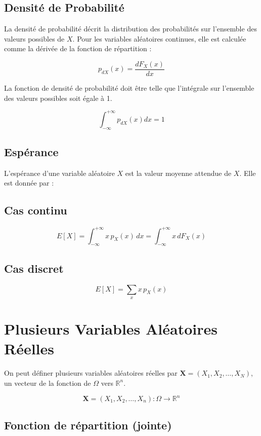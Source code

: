 \documentclass{article}
\begin{document}
\subsection{Densité de Probabilité}

La densité de probabilité décrit la distribution des probabilités sur l'ensemble des valeurs possibles de $X$. Pour les variables aléatoires continues, elle est calculée comme la dérivée de la fonction de répartition :

\[
p_{dX}(x) = \frac{dF_X(x)}{dx}
\]

La fonction de densité de probabilité doit être telle que l'intégrale sur l'ensemble des valeurs possibles soit égale à 1.

\[
\int_{-\infty}^{+\infty}p_{dX}(x)dx = 1
\]

\subsection{Espérance}

L'espérance d'une variable aléatoire $X$ est la valeur moyenne attendue de $X$. Elle est donnée par :

\subsection{Cas continu}

\[
E[X] = \int_{-\infty}^{+\infty} x \, p_X(x) \, dx = \int_{-\infty}^{+\infty} x \, dF_X(x)
\]

\subsection{Cas discret}

\[
E[X] = \sum_{x} x \, p_X(x)
\]

\section{Plusieurs Variables Aléatoires Réelles}

On peut définer plusieurs variables aléatoires réelles par $ \mathbf{X} = (X_1, X_2, \dotsc, X_N) $, un vecteur de la fonction de $\Omega$ vers $\mathbb{R}^n$.

\[
\mathbf{X} = (X_1, X_2, \dotsc, X_n): \Omega \rightarrow \mathbb{R}^n
\]

\subsection{Fonction de répartition (jointe)}
\end{document}
